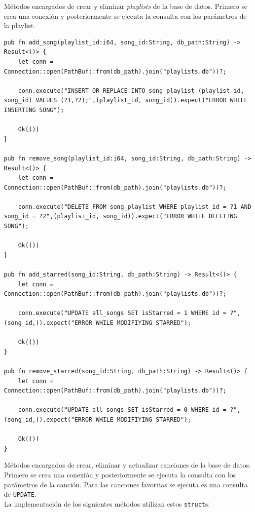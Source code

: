 \documentclass[11pt, a4paper]{article}
\begin{document}
            Métodos encargados de crear y eliminar \textit{playlists} de la base de datos. Primero se crea una conexión y posteriormente se ejecuta la consulta con los parámetros de la playlist.

            \begin{lstlisting}[caption={Operaciones CRUD canciones}]
pub fn add_song(playlist_id:i64, song_id:String, db_path:String) -> Result<()> {
    let conn = Connection::open(PathBuf::from(db_path).join("playlists.db"))?;

    conn.execute("INSERT OR REPLACE INTO song_playlist (playlist_id, song_id) VALUES (?1,?2);",(playlist_id, song_id)).expect("ERROR WHILE INSERTING SONG");

    Ok(())
}

pub fn remove_song(playlist_id:i64, song_id:String, db_path:String) -> Result<()> {
    let conn = Connection::open(PathBuf::from(db_path).join("playlists.db"))?;

    conn.execute("DELETE FROM song_playlist WHERE playlist_id = ?1 AND song_id = ?2",(playlist_id, song_id)).expect("ERROR WHILE DELETING SONG");

    Ok(())
}

pub fn add_starred(song_id:String, db_path:String) -> Result<()> {
    let conn = Connection::open(PathBuf::from(db_path).join("playlists.db"))?;

    conn.execute("UPDATE all_songs SET isStarred = 1 WHERE id = ?",(song_id,)).expect("ERROR WHILE MODIFIYING STARRED");

    Ok(())
}

pub fn remove_starred(song_id:String, db_path:String) -> Result<()> {
    let conn = Connection::open(PathBuf::from(db_path).join("playlists.db"))?;

    conn.execute("UPDATE all_songs SET isStarred = 0 WHERE id = ?",(song_id,)).expect("ERROR WHILE MODIFIYING STARRED");

    Ok(())
}
            \end{lstlisting}

            Métodos encargados de crear, eliminar y actualizar canciones de la base de datos. Primero se crea una conexión y posteriormente se ejecuta la consulta con los parámetros de la canción. Para las canciones favoritas se ejecuta es una consulta de \verb|UPDATE|. \\

            La implementación de los siguientes métodos utilizan estos \verb|struct|s:
\end{document}
